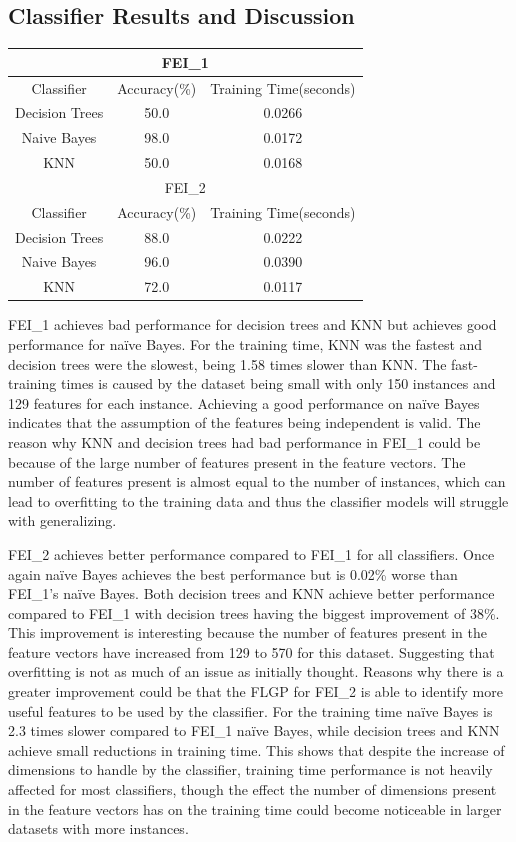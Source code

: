 \documentclass{article}
\begin{document}
\subsection*{Classifier Results and Discussion}
\begin{center}
	\begin{tabular}{|c|c|c|}
		\hline
		\multicolumn{3}{|c|}{FEI\_1} \\
		\hline
		Classifier & Accuracy(\%) & Training Time(seconds) \\
		\hline
		Decision Trees & 50.0 & 0.0266 \\
		\hline
		Naive Bayes & 98.0 & 0.0172 \\
		\hline
		KNN & 50.0 & 0.0168 \\		
		\hline
		\multicolumn{3}{|c|}{FEI\_2} \\
		\hline
		Classifier & Accuracy(\%) & Training Time(seconds) \\
		\hline
		Decision Trees & 88.0 & 0.0222 \\
		\hline
		Naive Bayes & 96.0 & 0.0390 \\
		\hline
		KNN & 72.0 & 0.0117 \\		
		\hline
	\end{tabular}
\end{center}
FEI\_1 achieves bad performance for decision trees and KNN but achieves good performance for naïve Bayes. For the training time, KNN was the fastest and decision trees were the slowest, being 1.58 times slower than KNN. The fast-training times is caused by the dataset being small with only 150 instances and 129 features for each instance. Achieving a good performance on naïve Bayes indicates that the assumption of the features being independent is valid. The reason why KNN and decision trees had bad performance in FEI\_1 could be because of the large number of features present in the feature vectors. The number of features present is almost equal to the number of instances, which can lead to overfitting to the training data and thus the classifier models will struggle with generalizing. \par
\noindent FEI\_2 achieves better performance compared to FEI\_1 for all classifiers. Once again naïve Bayes achieves the best performance but is 0.02\% worse than FEI\_1’s naïve Bayes. Both decision trees and KNN achieve better performance compared to FEI\_1 with decision trees having the biggest improvement of 38\%. This improvement is interesting because the number of features present in the feature vectors have increased from 129 to 570 for this dataset. Suggesting that overfitting is not as much of an issue as initially thought. Reasons why there is a greater improvement could be that the FLGP for FEI\_2 is able to identify more useful features to be used by the classifier. For the training time naïve Bayes is 2.3 times slower compared to FEI\_1 naïve Bayes, while decision trees and KNN achieve small reductions in training time. This shows that despite the increase of dimensions to handle by the classifier, training time performance is not heavily affected for most classifiers, though the effect the number of dimensions present in the feature vectors has on the training time could become noticeable in larger datasets with more instances.  \par
\end{document}
